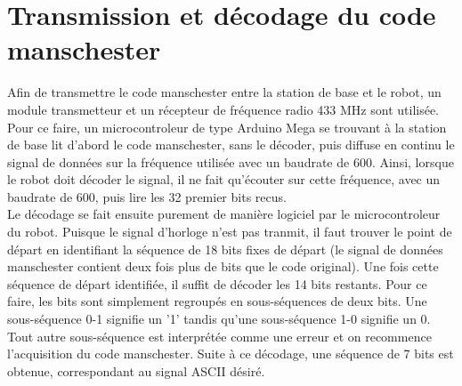 \section{Transmission et décodage du code manschester}

Afin de transmettre le code manschester entre la station de base et le robot, un module transmetteur et un récepteur de fréquence radio 433 MHz sont utilisée. Pour ce faire, un microcontroleur de type Arduino Mega se trouvant à la station de base lit d'abord le code manschester, sans le décoder, puis diffuse en continu le signal de données sur la fréquence utilisée avec un baudrate de 600. Ainsi, lorsque le robot doit décoder le signal, il ne fait qu'écouter sur cette fréquence, avec un baudrate de 600, puis lire les 32 premier bits recus.
\\
Le décodage se fait ensuite purement de manière logiciel par le microcontroleur du robot. Puisque le signal d'horloge n'est pas tranmit, il faut trouver le point de départ en identifiant la séquence de 18 bits fixes de départ (le signal de données manschester contient deux fois plus de bits que le code original). Une fois cette séquence de départ identifiée, il suffit de décoder les 14 bits restants. Pour ce faire, les bits sont simplement regroupés en sous-séquences de deux bits. Une sous-séquence 0-1 signifie un '1' tandis qu'une sous-séquence 1-0 signifie un 0. Tout autre sous-séquence est interprétée comme une erreur et on recommence l'acquisition du code manschester. Suite à ce décodage, une séquence de 7 bits est obtenue, correspondant au signal ASCII désiré.